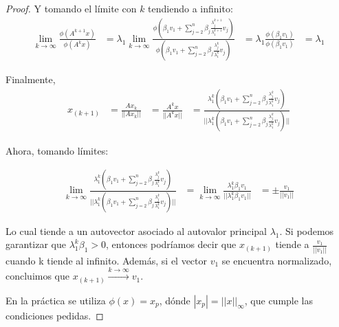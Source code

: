 \begin{proof}
Y tomando el límite con $k$ tendiendo a infinito:
\begin{equation*}
        \begin{aligned}
        \lim\limits_{k \to \infty} \frac{\phi(A^{k+1}x)}{\phi(A^kx)}
            &= \lambda_1 \lim\limits_{k \to \infty}
                    \frac{\phi\left(\beta_1 v_1 +\sum\limits_{j=2}^{n}{\beta_j \frac{\lambda_j^{k+1}}{\lambda_1^{k+1}} v_j} \right)}
                    {\phi\left(\beta_1 v_1 +\sum\limits_{j=2}^{n}{\beta_j \frac{\lambda_j^k}{\lambda_1^k} v_j} \right)}
            &= \lambda_1 \frac{\phi\left(\beta_1 v_1\right)}{\phi\left(\beta_1 v_1 \right)}
            &= \lambda_1
        \end{aligned}
\end{equation*}

Finalmente,
\begin{equation*}
        \begin{aligned}
          x_{(k+1)}
            &= \frac{Ax_k}{||Ax_k||}
            &= \frac{A^kx}{||A^kx||}
            &= \frac{\lambda_1^k \left(\beta_1 v_1 +\sum\limits_{j=2}^{n}{\beta_j \frac{\lambda_j^k}{\lambda_1^k} v_j} \right)}{||\lambda_1^k \left(\beta_1 v_1 +\sum\limits_{j=2}^{n}{\beta_j \frac{\lambda_j^k}{\lambda_1^k} v_j} \right)||}
        \end{aligned}
\end{equation*}

Ahora, tomando límites:

\begin{equation*}
        \begin{aligned}
        \lim\limits_{k \to \infty} \frac{\lambda_1^k \left(\beta_1 v_1 +\sum\limits_{j=2}^{n}{\beta_j \frac{\lambda_j^k}{\lambda_1^k} v_j} \right)}{||\lambda_1^k \left(\beta_1 v_1 +\sum\limits_{j=2}^{n}{\beta_j \frac{\lambda_j^k}{\lambda_1^k} v_j} \right)||}
        &= \lim\limits_{k \to \infty} \frac{\lambda_1^k \beta_1 v_1}{||\lambda_1^k \beta_1 v_1||}
        &= \pm \frac{v_1}{||v_1||}
        \end{aligned}
\end{equation*}

Lo cual tiende a un autovector asociado al autovalor principal $\lambda_1$. Si podemos garantizar que $\lambda_1^k \beta_1> 0$, entonces podríamos decir que $x_{(k+1)}$ tiende a $\frac{v_1}{||v_1||}$ cuando k tiende al infinito. Además, si el vector $v_1$ se encuentra normalizado, concluimos que $x_{(k+1)}  \xrightarrow{k \to \infty} v_1$.

En la práctica se utiliza $\phi(x)= x_p$, dónde $|x_p| = ||x||_\infty$, que cumple las condiciones pedidas.
\end{proof}
